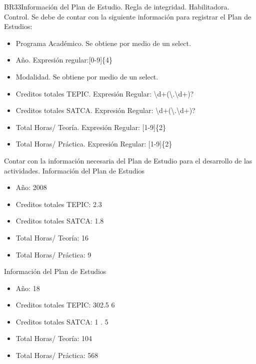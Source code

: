 \begin{BussinesRule}{BR33}{Información del Plan de Estudio.}
	\BRitem[Tipo:] Regla de integridad.
	\BRitem[Clase:] Habilitadora.
	\BRitem[Nivel:] Control.
	\BRitem[Descripción:]Se debe de contar con la siguiente información para registrar el Plan de Estudios:
	\begin{itemize}
		\item Programa Académico. Se obtiene por medio de un select.
		\item Año. Expresión regular:[0-9]\{4\}  
		\item Modalidad. Se obtiene por medio de un select.
		\item Creditos totales TEPIC. Expresión Regular: \textbackslash d+(\textbackslash.\textbackslash d+)?
		\item Creditos totales SATCA. Expresión Regular: \textbackslash d+(\textbackslash.\textbackslash d+)?
		\item Total Horas/ Teoría. Expresión Regular: [1-9]\{2\}
		\item Total Horas/ Práctica. Expresión Regular: [1-9]\{2\}  
	\end{itemize} 

	\BRitem[Motivación:] Contar con la información necesaria del Plan de Estudio para el desarrollo de las actividades.
	 Información del Plan de Estudios 
	\begin{itemize}
		\item Año: 2008
		\item Creditos totales TEPIC: 2.3
		\item Creditos totales SATCA: 1.8
		\item Total Horas/ Teoría: 16
		\item Total Horas/ Práctica: 9
	\end{itemize}
	 Información del Plan de Estudios 
	\begin{itemize}
		\item Año: 18
		\item Creditos totales TEPIC: 302.5 6
		\item Creditos totales SATCA: 1 . 5
		\item Total Horas/ Teoría: 104
		\item Total Horas/ Práctica: 568
	\end{itemize}
\end{BussinesRule}

